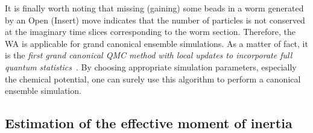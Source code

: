 \documentclass[12pt]{iopart}
\begin{document}
It is finally worth noting that missing (gaining) some beads in a worm generated by an Open (Insert) move indicates that the number of particles is not conserved at the imaginary time slices corresponding to the worm section. Therefore, the WA is applicable for grand canonical ensemble simulations. 
As a matter of fact, it is the {\em first grand canonical QMC method with local updates to incorporate  full quantum statistics}~\cite{boninsegni_worm_2}. 
By choosing appropriate simulation parameters, especially the chemical potential, one can surely use this algorithm to perform a canonical ensemble simulation.

\subsection{Estimation of the effective moment of inertia} \label{subsec:Ieff_estim}
\end{document}
